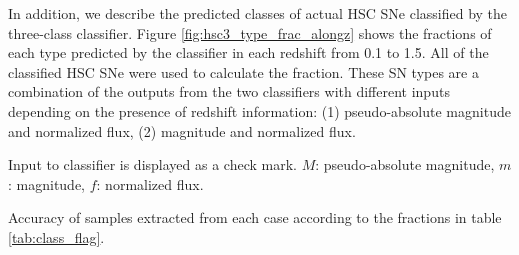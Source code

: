 \documentclass[useamsfonts]{pasj01}
\begin{document}
In addition, we describe the predicted classes of actual HSC SNe classified by the three-class classifier.
Figure \ref{fig:hsc3_type_frac_alongz} shows the fractions of each type predicted by the classifier in each redshift from 0.1 to 1.5.
All of the classified HSC SNe were used to calculate the fraction.
These SN types are a combination of the outputs from the two classifiers with different inputs depending on the presence of redshift information: (1) pseudo-absolute magnitude and normalized flux, (2) magnitude and normalized flux.

%
%
%
%
\begin{table}[htbp]
\label{tab:h3_validation}
\begin{tabnote}
\footnotemark[$*$] Input to classifier is displayed as a check mark. $M$: pseudo-absolute magnitude, $m$: magnitude, $f$: normalized flux.

\footnotemark[$\dagger$] %
Accuracy of samples extracted from each case according to the fractions in table \ref{tab:class_flag}.
\end{tabnote}
\end{table}
\end{document}
